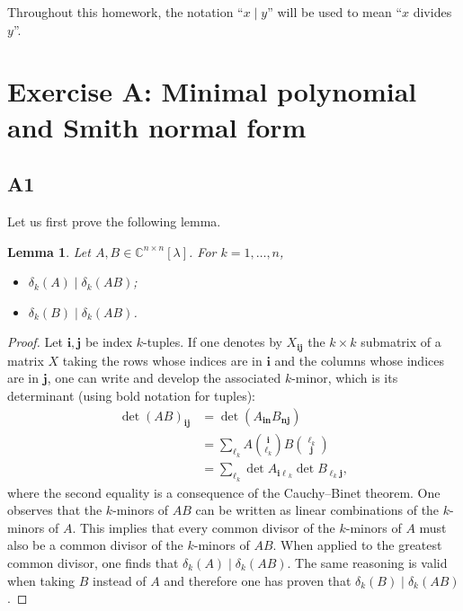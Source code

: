 \documentclass[11pt]{article}
\newtheorem*{lemma}{Lemma}
\newcommand{\complex}{\mathbb{C}} %
\begin{document}
Throughout this homework, the notation ``\(x \mid y\)'' will be used to mean ``\(x\) divides \(y\)''.
\section*{Exercise A: Minimal polynomial and Smith normal form}
\subsection*{A1}
Let us first prove the following lemma.
\begin{lemma}
 Let $A, B \in\complex^{n\times n}[\lambda]$.
 For $k=1, \dots, n$,
 \begin{itemize}
     \item $\delta_k(A) \mid \delta_k(AB)$;
     \item $\delta_k(B) \mid \delta_k(AB)$.
 \end{itemize}
\end{lemma}
\begin{proof}
Let \(\bm{i}, \bm{j}\) be index \(k\)-tuples.
If one denotes by $X_{\bm{ij}}$ the \(k \times k\) submatrix of a matrix $X$ taking the rows whose indices are in $\bm{i}$ and the columns whose indices are in $\bm{j}$, one can write and develop the associated \(k\)-minor, which is its determinant (using bold notation for tuples):
\begin{align*}
    \det (AB)_{\bm{ij}}&=\det(A_{\bm{in}}B_{\bm{nj}})\\
    &=\sum_{\bm{\ell}_k} A\binom{\bm{i}}{\bm{\ell}_k}B\binom{\bm{\ell}_k}{\bm{j}}\\
    &=\sum_{\bm{\ell}_k} \det A_{\bm{i\ell}_k} \det B_{\bm{\ell}_k \bm{j}},
\end{align*}
where the second equality is a consequence of the Cauchy--Binet theorem.
One observes that the \(k\)-minors of $AB$ can be written as linear combinations of the \(k\)-minors of $A$. This implies that every common divisor of the \(k\)-minors of $A$ must also be a common divisor of the \(k\)-minors of $AB$. When applied to the greatest common divisor, one finds that $\delta_k(A) \mid \delta_k(AB)$. The same reasoning is valid when taking $B$ instead of $A$ and therefore one has proven that $\delta_k(B) \mid \delta_k(AB)$.
\end{proof}
\end{document}
